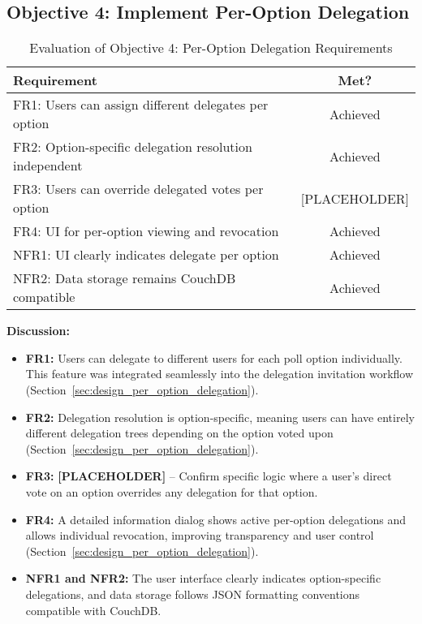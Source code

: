 \subsection{Objective 4: Implement Per-Option Delegation}

\begin{table}[H]
\centering
\begin{tabular}{|p{9cm}|c|}
\hline
\textbf{Requirement} & \textbf{Met?} \\ \hline
FR1: Users can assign different delegates per option & Achieved \\ \hline
FR2: Option-specific delegation resolution independent & Achieved \\ \hline
FR3: Users can override delegated votes per option & [PLACEHOLDER] \\ \hline
FR4: UI for per-option viewing and revocation & Achieved \\ \hline
NFR1: UI clearly indicates delegate per option & Achieved \\ \hline
NFR2: Data storage remains CouchDB compatible & Achieved \\ \hline
\end{tabular}
\caption{Evaluation of Objective 4: Per-Option Delegation Requirements}
\label{tab:objective4_requirements}
\end{table}

\textbf{Discussion:}

\begin{itemize}
    \item \textbf{FR1:} Users can delegate to different users for each poll option individually. This feature was integrated seamlessly into the delegation invitation workflow (Section~\ref{sec:design_per_option_delegation}).
    \item \textbf{FR2:} Delegation resolution is option-specific, meaning users can have entirely different delegation trees depending on the option voted upon (Section~\ref{sec:design_per_option_delegation}).
    \item \textbf{FR3:} \textbf{[PLACEHOLDER]} -- Confirm specific logic where a user's direct vote on an option overrides any delegation for that option.
    \item \textbf{FR4:} A detailed information dialog shows active per-option delegations and allows individual revocation, improving transparency and user control (Section~\ref{sec:design_per_option_delegation}).
    \item \textbf{NFR1 and NFR2:} The user interface clearly indicates option-specific delegations, and data storage follows JSON formatting conventions compatible with CouchDB.
\end{itemize}

